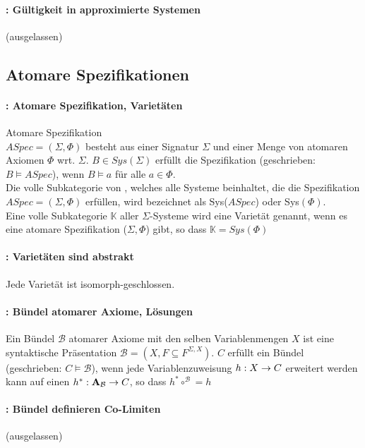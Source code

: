 \paragraph{: Gültigkeit in approximierte Systemen}
(ausgelassen)


\subsection{Atomare Spezifikationen}

\paragraph{: Atomare Spezifikation, Varietäten} 
Atomare Spezifikation \\ $ASpec = (\Sigma, \Phi)$ besteht aus einer Signatur $\Sigma$ und einer Menge von atomaren Axiomen $\Phi$ wrt. $\Sigma$.
$B \in Sys(\Sigma) $ erfüllt die Spezifikation (geschrieben: $B \models ASpec$), wenn $B \models a$ für alle $a \in \Phi$. \\
Die volle Subkategorie von \syssig, welches alle Systeme beinhaltet, die die Spezifikation $ASpec = (\Sigma, \Phi)$ erfüllen, wird bezeichnet als Sys($ASpec$) oder Sys$(\Phi)$. \\
Eine volle Subkategorie $\mathbb{K}$ aller $\Sigma$-Systeme wird eine Varietät genannt, wenn es eine atomare Spezifikation ($\Sigma, \Phi$) gibt, so dass $\mathbb{K} = Sys(\Phi)$


\paragraph{: Varietäten sind abstrakt} 
Jede Varietät ist isomorph-geschlossen.

\paragraph{: Bündel atomarer Axiome, Lösungen} 
Ein Bündel $\mathcal{B}$ atomarer Axiome mit den selben Variablenmengen $X$ ist eine syntaktische Präsentation $\mathcal{B} = (X, F \subseteq F^{\Sigma, X})$.
$C$ erfüllt ein Bündel (geschrieben: $C \models \mathcal{B}$), wenn jede Variablenzuweisung $h: X \rightarrow C$ erweitert werden kann auf einen \homo $h^*: \mathbf{A}_\mathcal{B} \rightarrow C$, so dass $h^* \circ^\mathcal{B} = h$


\paragraph{: Bündel definieren Co-Limiten} 
(ausgelassen)

